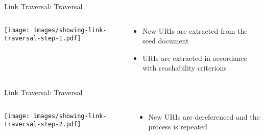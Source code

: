 \begin{frame}{Link Traversal: Traversal}
    \begin{columns}[T] %
        \begin{column}{0.6\textwidth} %
            \texttt{[image: images/showing-link-traversal-step-1.pdf]} %
        \end{column}

        \begin{column}{0.4\textwidth} %
            \begin{itemize}
                \item New URIs are extracted from the seed document
                \item URIs are extracted in accordance with reachability criterions
            \end{itemize}
        \end{column}
    \end{columns}
\end{frame}


\begin{frame}{Link Traversal: Traversal}
    \begin{columns}[T] %
        \begin{column}{0.6\textwidth} %
            \texttt{[image: images/showing-link-traversal-step-2.pdf]} %
        \end{column}

        \begin{column}{0.4\textwidth} %
            \begin{itemize}
                \item New URIs are dereferenced and the process is repeated
            \end{itemize}
        \end{column}
    \end{columns}
\end{frame}



